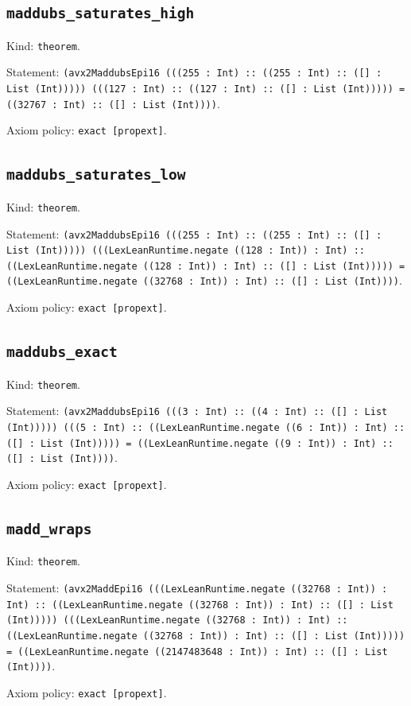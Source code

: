 \documentclass[11pt]{article}
\begin{document}
\subsection*{\texttt{maddubs\_saturates\_high}}
\noindent Kind: \texttt{theorem}.\par
\noindent Statement: \texttt{(avx2MaddubsEpi16 (((255 : Int) :: ((255 : Int) :: ([] : List (Int))))) (((127 : Int) :: ((127 : Int) :: ([] : List (Int))))) = ((32767 : Int) :: ([] : List (Int))))}.\par
\noindent Axiom policy: \texttt{exact [propext]}.\par
\subsection*{\texttt{maddubs\_saturates\_low}}
\noindent Kind: \texttt{theorem}.\par
\noindent Statement: \texttt{(avx2MaddubsEpi16 (((255 : Int) :: ((255 : Int) :: ([] : List (Int))))) (((LexLeanRuntime.negate ((128 : Int)) : Int) :: ((LexLeanRuntime.negate ((128 : Int)) : Int) :: ([] : List (Int))))) = ((LexLeanRuntime.negate ((32768 : Int)) : Int) :: ([] : List (Int))))}.\par
\noindent Axiom policy: \texttt{exact [propext]}.\par
\subsection*{\texttt{maddubs\_exact}}
\noindent Kind: \texttt{theorem}.\par
\noindent Statement: \texttt{(avx2MaddubsEpi16 (((3 : Int) :: ((4 : Int) :: ([] : List (Int))))) (((5 : Int) :: ((LexLeanRuntime.negate ((6 : Int)) : Int) :: ([] : List (Int))))) = ((LexLeanRuntime.negate ((9 : Int)) : Int) :: ([] : List (Int))))}.\par
\noindent Axiom policy: \texttt{exact [propext]}.\par
\subsection*{\texttt{madd\_wraps}}
\noindent Kind: \texttt{theorem}.\par
\noindent Statement: \texttt{(avx2MaddEpi16 (((LexLeanRuntime.negate ((32768 : Int)) : Int) :: ((LexLeanRuntime.negate ((32768 : Int)) : Int) :: ([] : List (Int))))) (((LexLeanRuntime.negate ((32768 : Int)) : Int) :: ((LexLeanRuntime.negate ((32768 : Int)) : Int) :: ([] : List (Int))))) = ((LexLeanRuntime.negate ((2147483648 : Int)) : Int) :: ([] : List (Int))))}.\par
\noindent Axiom policy: \texttt{exact [propext]}.\par
\end{document}
